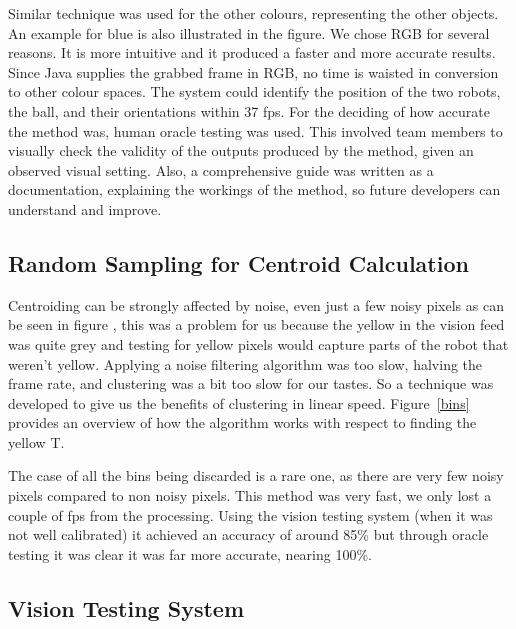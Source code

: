 Similar technique was used for the other colours, representing the other objects. An example for blue is also illustrated in the figure. We chose RGB for several reasons. It is more intuitive and it produced a faster and more accurate results. Since Java supplies the grabbed frame in RGB, no time is waisted in conversion to other colour spaces. The system could identify the position of the two robots, the ball, and their orientations within 37 fps. For the deciding of how accurate the method was, human oracle testing was used. This involved team members to visually check the validity of the outputs produced by the method, given an observed visual setting. Also, a comprehensive guide was written as a documentation, explaining the workings of the method, so future developers can understand and improve. 

\subsection{Random Sampling for Centroid Calculation}

Centroiding can be strongly affected by noise, even just a few noisy pixels as can be seen in figure \cite{vis1}, this was a problem for us because the yellow in the vision feed was quite grey and testing for yellow pixels would capture parts of the robot that weren't yellow.  Applying a noise filtering algorithm was too slow, halving the frame rate, and clustering was a bit too slow for our tastes.  So a technique was developed to give us the benefits of clustering in linear speed.  Figure~\ref{bins} provides an overview of how the algorithm works with respect to finding the yellow T.

The case of all the bins being discarded is a rare one, as there are very few noisy pixels compared to non noisy pixels.  This method was very fast, we only lost a couple of fps from the processing.  Using the vision testing system (when it was not well calibrated) it achieved an accuracy of around 85\% but through oracle testing it was clear it was far more accurate, nearing 100\%.

\subsection{Vision Testing System}

